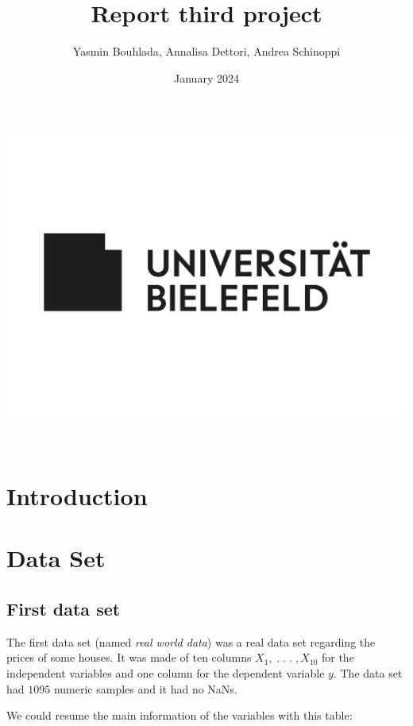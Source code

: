 \documentclass[a4paper,oneside,12pt]{article}
\author{Yasmin Bouhlada, Annalisa Dettori, Andrea Schinoppi}
\title{Report third project}
\date{January 2024}
\begin{document}
\makeatletter
    \begin{titlepage}
        \begin{center}
            \includegraphics[width=0.7\linewidth]{Bielefeld_University.png}\\[4ex]
            {\huge \bfseries  \@title }\\[2ex] 
            {\large  \@author}\\[50ex] 
            {\large \@date}
        \end{center}
    \end{titlepage}
\makeatother
\thispagestyle{empty}
\newpage

\section{Introduction}

\section{Data Set}

\subsection{First data set}

The first data set (named \textit{real world data}) was a real data set regarding the prices of some houses. It was made of ten columns $X_1,\;.\;.\;.\;,X_{10}$ for the independent variables and one column for the dependent variable $y$. The data set had $1095$ numeric samples and it had no NaNs.

We could resume the main information of the variables with this table:  
\end{document}
